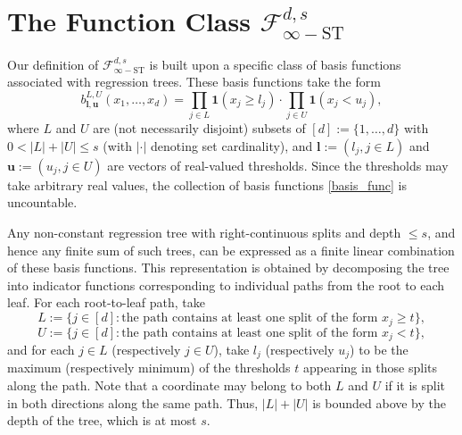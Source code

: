 \documentclass[10pt]{article}
\newcommand{\fstinf}{{\mathcal{F}^{d, s}_{\infty-\text{ST}}}}
\newcommand{\lbf}{{\mathbf{l}}}
\newcommand{\ubf}{{\mathbf{u}}}
\newcommand{\ind}{{\mathbf{1}}}
\begin{document}
\section{The Function Class $\fstinf$}\label{sec:fstinf}

Our definition of $\fstinf$ is built upon a specific class of basis
functions associated with regression trees. These basis functions
take the form
\begin{equation}\label{basis_func}
    b^{L, U}_{\lbf, \ubf}(x_1, \dots, x_d) 
    = \prod_{j \in L} \ind(x_j \ge l_j) 
    \cdot \prod_{j \in U} \ind(x_j < u_j),
\end{equation}
where $L$ and $U$ are (not necessarily disjoint) subsets of 
$[d] := \{1, \dots, d\}$ with $0 < |L| + |U| \le s$ (with $|\cdot|$ 
denoting set cardinality), and $\lbf := (l_j, j \in L)$ and 
$\ubf := (u_j, j \in U)$ are vectors of real-valued thresholds. 
Since the thresholds may take arbitrary real values, the collection 
of basis functions \eqref{basis_func} is uncountable.   

Any non-constant regression tree with right-continuous splits and 
depth $\le s$, and hence any finite sum of such trees, can be 
expressed as a finite linear combination of these basis functions. 
This representation is obtained by decomposing the tree into 
indicator functions corresponding to individual paths from the root 
to each leaf. For each root-to-leaf path, take 
\begin{equation*}
    L := \{j \in [d]: \text{the path contains at least one split of 
    the form } x_j \ge t \},
\end{equation*}
\begin{equation*}
    U := \{j \in [d]: \text{the path contains at least one split of 
    the form } x_j < t \},
\end{equation*}
and for each $j \in L$ (respectively $j \in U$), take $l_j$ 
(respectively $u_j$) to be the maximum (respectively minimum) of the
thresholds $t$ appearing in those splits along the path. Note that a
coordinate may belong to both $L$ and $U$ if it is split in both
directions along the same path. Thus, $|L| + |U|$ is bounded above 
by the depth of the tree, which is at most $s$.
\end{document}
